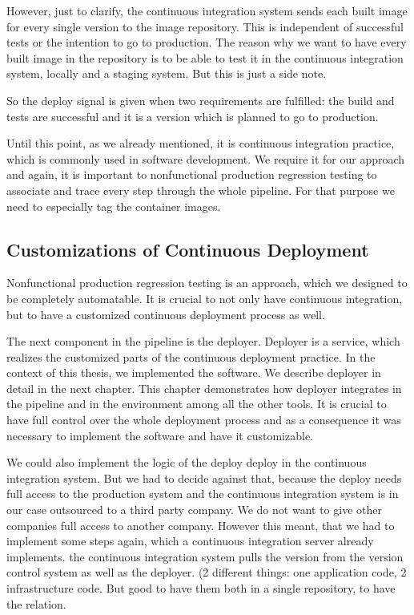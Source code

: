However, just to clarify, the continuous integration system sends each built image for
every single version to the image repository. This is independent of successful tests or
the intention to go to production. The reason why we want to have every built image in the
repository is to be able to test it in the continuous integration system, locally and a
staging system. But this is just a side note.

So the deploy signal is given when two requirements are fulfilled: the build and tests are
successful and it is a version which is planned to go to production.

Until this point, as we already mentioned, it is continuous integration practice, which is
commonly used in software development. We require it for our approach and again, it is
important to nonfunctional production regression testing to associate and trace every step
through the whole pipeline. For that purpose we need to especially tag the container
images.

\subsection{Customizations of Continuous Deployment}

Nonfunctional production regression testing is an approach, which we designed to be
completely automatable. It is crucial to not only have continuous integration, but to have
a customized continuous deployment process as well.

The next component in the pipeline is the deployer. Deployer is a service, which realizes
the customized parts of the continuous deployment practice. In the context of this thesis,
we implemented the software. We describe deployer in detail in the next chapter. This
chapter demonstrates how deployer integrates in the pipeline and in the environment among
all the other tools. It is crucial to have full control over the whole deployment process
and as a consequence it was necessary to implement the software and have it customizable.

We could also implement the logic of the deploy deploy in the continuous integration
system. But we had to decide against that, because the deploy needs full access to the
production system and the continuous integration system is in our case outsourced to a
third party company. We do not want to give other companies full access to another
company. However this meant, that we had to implement some steps again, which a continuous
integration server already implements.  the continuous integration system pulls the
version from the version control system as well as the deployer. (2 different things: one
application code, 2 infrastructure code. But good to have them both in a single
repository, to have the relation.

